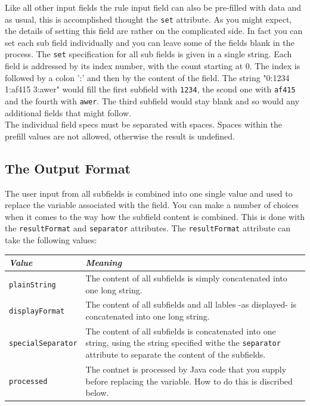 Like all other input fields the rule input field can also be pre-filled
with data and as usual, this is accomplished thought the \texttt{set}
attribute. As you might expect, the details of setting this field are
rather on the complicated side. In fact you can set each sub field
individually and you can leave some of the fields blank in the process.
The \texttt{set} specification for all sub fields is given in a single
string. Each field is addressed by its index number, with the count
starting at 0. The index is followed by a colon ':' and then by the
content of the field. The string "0:1234 1:af415 3:awer" would fill the
first subfield with \texttt{1234}, the scond one with \texttt{af415} and
the fourth with \texttt{awer}. The third subfield would stay blank
and so would any additional fields that might follow.\\

The individual field specs must be separated with spaces. Spaces within
the prefill values are not allowed, otherwise the result is undefined.\\

\subsection{The Output Format}

The user input from all subfields is combined into one single value and
used to replace the variable associated with the field. You can make a
number of choices when it comes to the way how the subfield content is
combined. This is done with the \texttt{resultFormat} and
\texttt{separator} attributes. The \texttt{resultFormat} attribute can
take the following values:\\

\begin{center}
\begin{tabularx}{\textwidth}{|l|X|}
\hline \textit{Value} & \textit{Meaning}\\
\hline \texttt{plainString} & The content of all subfields is simply concatenated into one long string.\\
\hline \texttt{displayFormat} & The content of all subfields and all lables -as displayed- is concatenated into one long string.\\
\hline \texttt{specialSeparator} & The content of all subfields is concatenated into one string, using the string specified withe the \texttt{separator} attribute to separate the content of the subfields.\\
\hline \texttt{processed} & The contnet is processed by Java code that you supply before replacing the variable. How to do this is discribed below.\\
\hline
\end{tabularx}\
\end{center}


